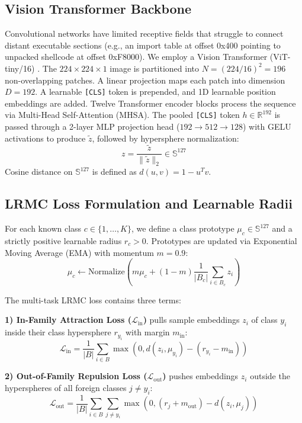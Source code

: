 \documentclass[conference]{IEEEtran}
\begin{document}
\subsection{Vision Transformer Backbone}
Convolutional networks have limited receptive fields that struggle to connect distant executable sections (e.g., an import table at offset 0x400 pointing to unpacked shellcode at offset 0xF8000). We employ a Vision Transformer (ViT-tiny/16) \cite{dosovitskiy2020}. The $224 \times 224 \times 1$ image is partitioned into $N = (224/16)^2 = 196$ non-overlapping patches. A linear projection maps each patch into dimension $D = 192$. A learnable \texttt{[CLS]} token is prepended, and 1D learnable position embeddings are added. Twelve Transformer encoder blocks process the sequence via Multi-Head Self-Attention (MHSA). The pooled \texttt{[CLS]} token $h \in \mathbb{R}^{192}$ is passed through a 2-layer MLP projection head ($192 \rightarrow 512 \rightarrow 128$) with GELU activations to produce $\tilde{z}$, followed by hypersphere normalization:
\begin{equation}
z = \frac{\tilde{z}}{\|\tilde{z}\|_2} \in \mathbb{S}^{127}
\end{equation}
Cosine distance on $\mathbb{S}^{127}$ is defined as $d(u, v) = 1 - u^T v$.

\subsection{LRMC Loss Formulation and Learnable Radii}
For each known class $c \in \{1, \dots, K\}$, we define a class prototype $\mu_c \in \mathbb{S}^{127}$ and a strictly positive learnable radius $r_c > 0$. Prototypes are updated via Exponential Moving Average (EMA) with momentum $m = 0.9$:
\begin{equation}
\mu_c \leftarrow \text{Normalize}\left(m \mu_c + (1 - m) \frac{1}{|B_c|} \sum_{i \in B_c} z_i\right)
\end{equation}

The multi-task LRMC loss contains three terms:

\textbf{1) In-Family Attraction Loss ($\mathcal{L}_{\text{in}}$)} pulls sample embeddings $z_i$ of class $y_i$ inside their class hypersphere $r_{y_i}$ with margin $m_{\text{in}}$:
\begin{equation}
\mathcal{L}_{\text{in}} = \frac{1}{|B|} \sum_{i \in B} \max\left(0, d(z_i, \mu_{y_i}) - (r_{y_i} - m_{\text{in}})\right)
\end{equation}

\textbf{2) Out-of-Family Repulsion Loss ($\mathcal{L}_{\text{out}}$)} pushes embeddings $z_i$ outside the hyperspheres of all foreign classes $j \neq y_i$:
\begin{equation}
\mathcal{L}_{\text{out}} = \frac{1}{|B|} \sum_{i \in B} \sum_{j \neq y_i} \max\left(0, (r_j + m_{\text{out}}) - d(z_i, \mu_j)\right)
\end{equation}
\end{document}
